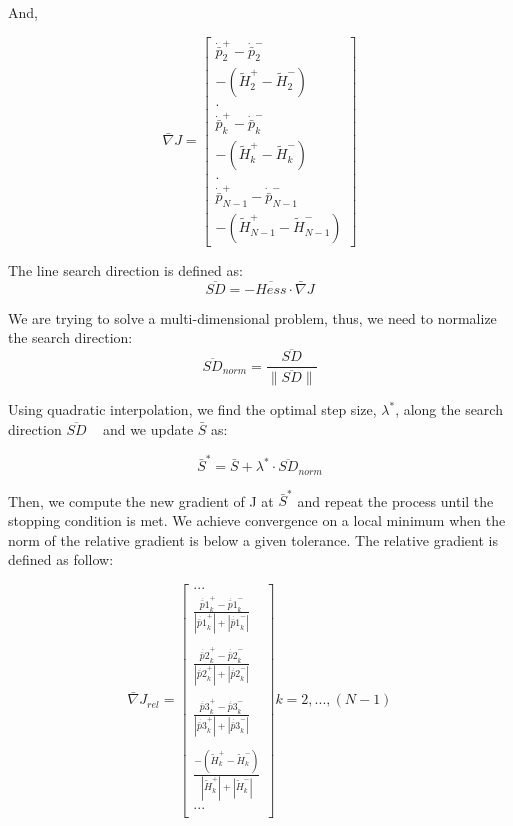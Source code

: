 \documentclass[12pt]{report}
\begin{document}
And,

\begin{equation}
\bar \nabla J = \left[ \begin{array}{c}
\dot{\bar p}_{2}^{+} - \dot{\bar p}_{2}^{-} \\
-(\tilde{H}_{2}^{+} - \tilde{H}_{2}^{-}) \\
. \\
\dot{\bar p}_{k}^{+} - \dot{\bar p}_{k}^{-} \\
-(\tilde{H}_{k}^{+} - \tilde{H}_{k}^{-}) \\
. \\
\dot{\bar p}_{N-1}^{+} - \dot{\bar p}_{N-1}^{-} \\
-(\tilde{H}_{N-1}^{+} - \tilde{H}_{N-1}^{-}) \end{array} \right]
\label{eq:gradJ}
\end{equation}

\noindent The line search direction is defined as:
\begin{equation}
\overline{SD} = - \overline{Hess} \cdot \bar \nabla J
\end{equation}

\noindent We are trying to solve a multi-dimensional problem,
thus, we need to normalize the search direction:
\begin{equation}
\overline{SD}_{norm} = \frac{\overline{SD}}{\|\overline{SD}\|}
\end{equation}

\noindent Using quadratic interpolation, we find the optimal step
size, $\lambda^{*}$, along the search direction $\overline{SD}$
~\cite{Rao96} and we update $\bar S$ as:

\begin{equation}
\bar S^{*} = \bar S + \lambda^{*} \cdot \overline {SD}_{norm}
\end{equation}

\noindent Then, we compute the new gradient of J at $\bar S^{*}$
and repeat the process until the stopping condition is met. We
achieve convergence on a local minimum when the norm of the
relative gradient is below a given tolerance. The relative
gradient is defined as follow:

\begin{equation}
\bar \nabla J_{rel} = \left[ \begin{array}{c}
...\\
\frac{\dot{\bar p1}_{k}^{+} - \dot{\bar p1}_{k}^{-}}{|\dot{\bar p1}_{k}^{+}| + |\dot{\bar p1}_{k}^{-}|} \\
\; \\
\frac{\dot{\bar p2}_{k}^{+} - \dot{\bar p2}_{k}^{-}}{|\dot{\bar p2}_{k}^{+}| + |\dot{\bar p2}_{k}^{-}|} \\
\; \\
\frac{\dot{\bar p3}_{k}^{+} - \dot{\bar p3}_{k}^{-}}{|\dot{\bar p3}_{k}^{+}| + |\dot{\bar p3}_{k}^{-}|} \\
\; \\
\frac{-(\tilde{H}_{k}^{+} - \tilde{H}_{k}^{-})}{|\tilde{H}_{k}^{+}| + |\tilde{H}_{k}^{-}| } \\
...\\
\end{array} \right] k = 2,...,(N-1)
\label{eq:gJrel}
\end{equation}
\end{document}
